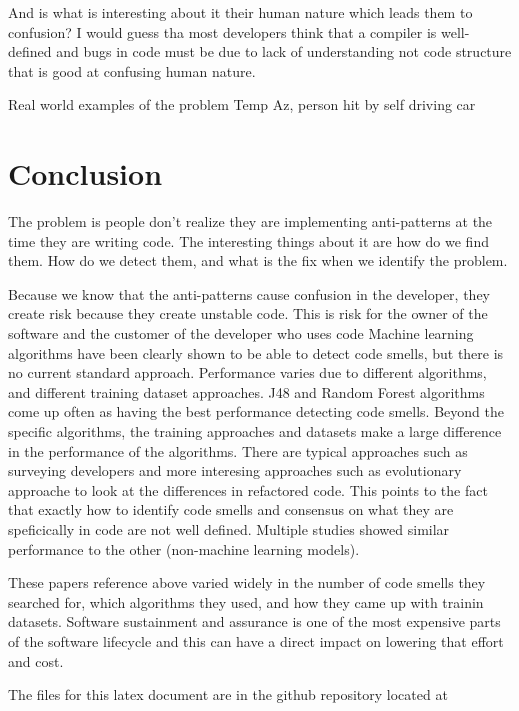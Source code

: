 \documentclass[conference]{IEEEtran}
\begin{document}
And is what is interesting about it their human nature which leads them to confusion?
I would guess tha most developers think that a compiler is well-defined and bugs in code must be due to lack of understanding not code structure that is good at confusing human nature.

Real world examples of the problem
Temp Az, person hit by self driving car\cite{noauthor_how_nodate}

\section{Conclusion}
The problem is people don't realize they are implementing anti-patterns at the time they are writing code.
The interesting things about it are how do we find them. 
How do we detect them, and what is the fix when we identify the problem.

Because we know that the anti-patterns cause confusion in the developer, they create risk because they create unstable code. 
This is risk for the owner of the software and the customer of the developer who uses code
Machine learning algorithms have been clearly shown to be able to detect code smells, but there is no current standard approach. 
Performance varies due to different algorithms, and different training dataset approaches. 
J48 and Random Forest algorithms come up often as having the best performance detecting code smells.
Beyond the specific algorithms, the training approaches and datasets make a large difference in the performance of the algorithms. 
There are typical approaches such as surveying developers and more interesing approaches such as evolutionary approache to look at the differences in refactored code.
This points to the fact that exactly how to identify code smells and consensus on what they are speficically in code are not well defined. Multiple studies showed similar performance to the other (non-machine learning models).

These papers reference above varied widely in the number of code smells they searched for, which algorithms they used, and how they came up with trainin datasets.
Software sustainment and assurance is one of the most expensive parts of the software lifecycle\cite{li_progress_2018} and this can have a direct impact on lowering that effort and cost.


The files for this latex document are in the github repository located at 




\end{document}
